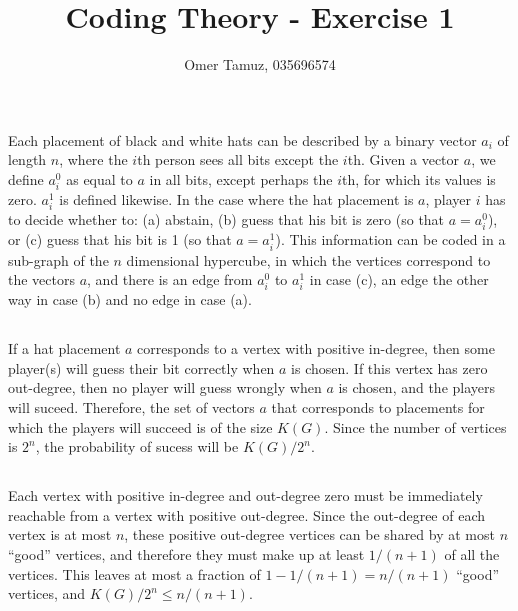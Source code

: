 \documentclass[11pt]{article} \usepackage{amssymb}
\begin{document}
\title{Coding Theory - Exercise 1}

 \author{Omer Tamuz, 035696574}
\maketitle

\section{}
Each placement of black and white hats can be described by a
binary vector $a_i$ of length $n$, where the $i$th person sees all bits
except the $i$th. Given a vector $a$, we define $a_i^0$ as equal to 
$a$ in all bits, except perhaps the $i$th, for which its values is zero.
$a_i^1$ is defined likewise. In the case where the hat placement is $a$, 
player $i$ has to decide whether to: (a) abstain, (b) guess that his bit is
zero (so that $a=a_i^0$), or (c) guess that his bit is 1 (so that $a=a_i^1$).
This information can be coded in a sub-graph of the $n$ dimensional
hypercube, in which the vertices correspond to the vectors $a$, 
and there is an edge from $a_i^0$ to $a_i^1$ in case (c), an edge the
other way in case (b) and no edge in case (a).
\subsection{}
If a hat placement $a$ corresponds to a vertex with positive in-degree,
then some player(s) will guess their bit correctly when $a$ is chosen. 
If this vertex has zero out-degree, then no player will guess wrongly
when $a$ is chosen, and the players will suceed. Therefore, the set
of vectors $a$ that corresponds to placements for which the players will
succeed is of the size $K(G)$. Since the number of vertices is $2^n$, 
the probability of sucess will be $K(G)/2^n$.

\subsection{}
Each vertex with positive in-degree and out-degree zero must be immediately 
reachable from a vertex with positive out-degree. Since the out-degree of 
each vertex is at most $n$, these positive out-degree vertices can be shared
by at most $n$ ``good'' vertices, and therefore they must make up at least
$1/(n+1)$ of all the vertices. This leaves at most a fraction of
$1-1/(n+1)=n/(n+1)$ ``good'' vertices, and $K(G)/2^n\leq n/(n+1)$.
\end{document}
